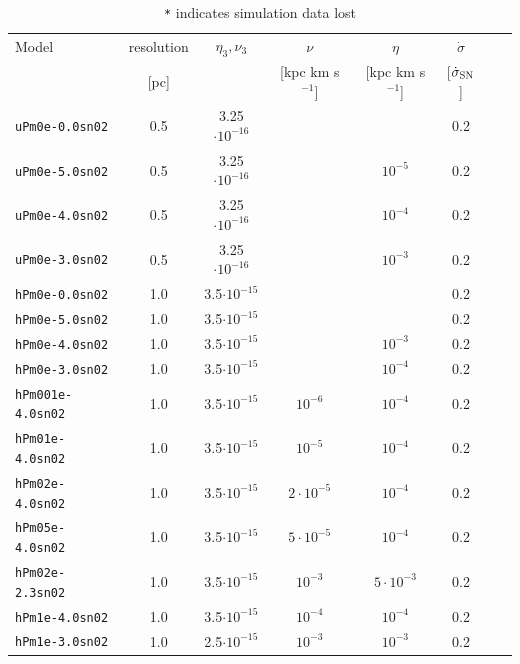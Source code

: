\documentclass[preprint2]{aastex63}
\begin{document}
\begin{table}
\caption{\texttt{*} indicates simulation data lost}
\begin{tabular}{lccccccc}
Model             & resolution & $\eta_3,\nu_3$      & $\nu$            & $\eta$          & $\dot\sigma$ & \\
                  & [pc]       &                     & [kpc km s$^{-1}$]&[kpc km s$^{-1}$]&[$\dot\sigma_{\rm SN}$]& \\
\texttt{uPm0e-0.0sn02}  & 0.5 & 3.25$\cdot10^{-16}$ &                  &                 &  0.2  \\
\texttt{uPm0e-5.0sn02}  & 0.5 & 3.25$\cdot10^{-16}$ &                  & $     10^{-5}$  &  0.2  \\
\texttt{uPm0e-4.0sn02}  & 0.5 & 3.25$\cdot10^{-16}$ &                  & $     10^{-4}$  &  0.2  \\
\texttt{uPm0e-3.0sn02}  & 0.5 & 3.25$\cdot10^{-16}$ &                  & $     10^{-3}$  &  0.2  \\
\texttt{hPm0e-0.0sn02}   & 1.0 & 3.5$\cdot10^{-15}$  &                  &                 &  0.2  \\
\texttt{hPm0e-5.0sn02}   & 1.0 & 3.5$\cdot10^{-15}$  &                  &                 &  0.2  \\
\texttt{hPm0e-4.0sn02}   & 1.0 & 3.5$\cdot10^{-15}$  &                  & $      10^{-3}$ &  0.2  \\
\texttt{hPm0e-3.0sn02}   & 1.0 & 3.5$\cdot10^{-15}$  &                  & $      10^{-4}$ &  0.2  \\
\texttt{hPm001e-4.0sn02} & 1.0 & 3.5$\cdot10^{-15}$  & $      10^{-6}$  & $      10^{-4}$ &  0.2  \\
\texttt{hPm01e-4.0sn02  }& 1.0 & 3.5$\cdot10^{-15}$  & $      10^{-5}$  & $      10^{-4}$ &  0.2  \\
\texttt{hPm02e-4.0sn02  }& 1.0 & 3.5$\cdot10^{-15}$  & $2\cdot10^{-5}$  & $      10^{-4}$ &  0.2  \\
\texttt{hPm05e-4.0sn02  }& 1.0 & 3.5$\cdot10^{-15}$  & $5\cdot10^{-5}$  & $      10^{-4}$ &  0.2  \\
\texttt{hPm02e-2.3sn02  }& 1.0 & 3.5$\cdot10^{-15}$  & $      10^{-3}$  & $5\cdot10^{-3}$ &  0.2  \\
\texttt{hPm1e-4.0sn02  } & 1.0 & 3.5$\cdot10^{-15}$  & $      10^{-4}$  & $      10^{-4}$ &  0.2  \\
\texttt{hPm1e-3.0sn02  } & 1.0 & 2.5$\cdot10^{-15}$  & $      10^{-3}$  & $      10^{-3}$ &  0.2  \\

\end{tabular}
\end{table}
\end{document}
